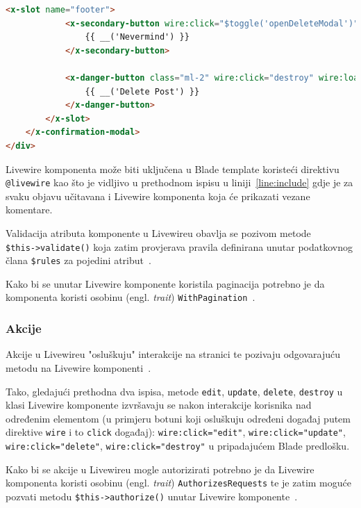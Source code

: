 \begin{lstlisting}[caption={\texttt{show-post.blade.php} - Blade datoteka Livewire komponente}, label=showPostBlade, language=HTML, escapechar=|]
        <x-slot name="footer">
            <x-secondary-button wire:click="$toggle('openDeleteModal')" wire:loading.attr="disabled">
                {{ __('Nevermind') }}
            </x-secondary-button>

            <x-danger-button class="ml-2" wire:click="destroy" wire:loading.attr="disabled">
                {{ __('Delete Post') }}
            </x-danger-button>
        </x-slot>
    </x-confirmation-modal>
</div>

\end{lstlisting}

Livewire komponenta može biti uključena u Blade template koristeći direktivu \\ \texttt{@livewire} kao što je vidljivo u prethodnom ispisu u liniji~\ref{line:include} gdje je za svaku objavu učitavana i Livewire komponenta koja će prikazati vezane komentare.

Validacija atributa komponente u Livewireu obavlja se pozivom metode \\ \texttt{\$this->validate()} koja zatim provjerava pravila definirana unutar podatkovnog člana \texttt{\$rules} za pojedini atribut~\cite{livewireValidation}.

Kako bi se unutar Livewire komponente koristila paginacija potrebno je da komponenta koristi osobinu (engl. \textit{trait}) \texttt{WithPagination}~\cite{livewirePagination}.

\subsubsection{Akcije}
Akcije u Livewireu "osluškuju" interakcije na stranici te pozivaju odgovarajuću metodu na Livewire komponenti~\cite{livewireActions}.

Tako, gledajući prethodna dva ispisa, metode \texttt{edit}, \texttt{update}, \texttt{delete}, \texttt{destroy} u klasi Livewire komponente izvršavaju se nakon interakcije korisnika nad određenim elementom (u primjeru botuni koji osluškuju određeni događaj putem direktive \texttt{wire} i to \texttt{click} događaj): \texttt{wire:click="edit"}, \texttt{wire:click="update"}, \\ \texttt{wire:click="delete"}, \texttt{wire:click="destroy"} u pripadajućem Blade predlošku.

Kako bi se akcije u Livewireu mogle autorizirati potrebno je da Livewire komponenta koristi osobinu (engl. \textit{trait}) \texttt{AuthorizesRequests} te je zatim moguće pozvati metodu \texttt{\$this->authorize()} unutar Livewire komponente~\cite{livewireAuthorization}. 

